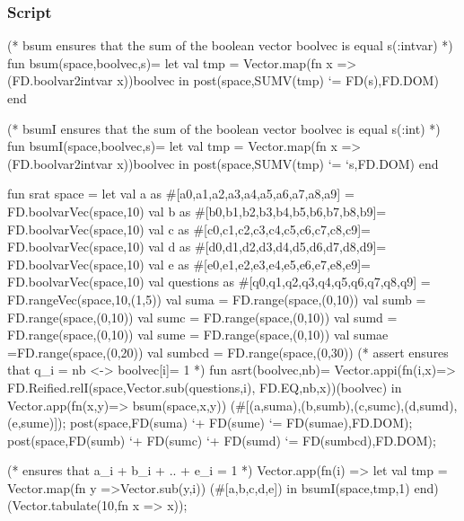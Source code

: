 \documentclass[a4paper]{scrartcl}
\begin{document}
\subsubsection{Script}
\begin{myverbatim}
(* bsum ensures that the sum of the boolean vector 
   boolvec is equal s(:intvar) *)
fun bsum(space,boolvec,s)=
    let
        val tmp = Vector.map(fn x => 
                      (FD.boolvar2intvar x))boolvec
    in
       post(space,SUMV(tmp) `= FD(s),FD.DOM)
    end
                                
(* bsumI ensures that the sum of the boolean vector 
   boolvec is equal s(:int) *)
fun bsumI(space,boolvec,s)= 
    let
        val tmp = Vector.map(fn x => 
                      (FD.boolvar2intvar x))boolvec
    in
       post(space,SUMV(tmp) `= `s,FD.DOM)
    end                         

fun srat space =
    let
        val a as #[a0,a1,a2,a3,a4,a5,a6,a7,a8,a9] = 
              FD.boolvarVec(space,10)
        val b as #[b0,b1,b2,b3,b4,b5,b6,b7,b8,b9]= 
              FD.boolvarVec(space,10)
        val c as #[c0,c1,c2,c3,c4,c5,c6,c7,c8,c9]= 
              FD.boolvarVec(space,10)
        val d as #[d0,d1,d2,d3,d4,d5,d6,d7,d8,d9]= 
              FD.boolvarVec(space,10)
        val e as #[e0,e1,e2,e3,e4,e5,e6,e7,e8,e9]= 
              FD.boolvarVec(space,10)   
        val questions as #[q0,q1,q2,q3,q4,q5,q6,q7,q8,q9] = 
              FD.rangeVec(space,10,(1,5))
        val suma = FD.range(space,(0,10))
        val sumb = FD.range(space,(0,10))
        val sumc = FD.range(space,(0,10))
        val sumd = FD.range(space,(0,10))
        val sume = FD.range(space,(0,10))
        val sumae =FD.range(space,(0,20))
        val sumbcd = FD.range(space,(0,30))
       (* assert ensures that q_i = nb <-> boolvec[i]= 1  *)
        fun asrt(boolvec,nb)= Vector.appi(fn(i,x)=> 
            FD.Reified.relI(space,Vector.sub(questions,i),
                                  FD.EQ,nb,x))(boolvec)
   in  
        Vector.app(fn(x,y)=> bsum(space,x,y))
             (#[(a,suma),(b,sumb),(c,sumc),(d,sumd),(e,sume)]);
        post(space,FD(suma) `+ FD(sume) `= FD(sumae),FD.DOM);
        post(space,FD(sumb) `+ FD(sumc) `+ FD(sumd) 
                    `= FD(sumbcd),FD.DOM);
            
       (* ensures that a_i + b_i + .. + e_i = 1 *)
        Vector.app(fn(i) => 
          let 
              val tmp = Vector.map(fn y =>Vector.sub(y,i))
                         (#[a,b,c,d,e])
          in
              bsumI(space,tmp,1)
          end)
              (Vector.tabulate(10,fn x => x)); 
                                   

\end{myverbatim}
\end{document}
